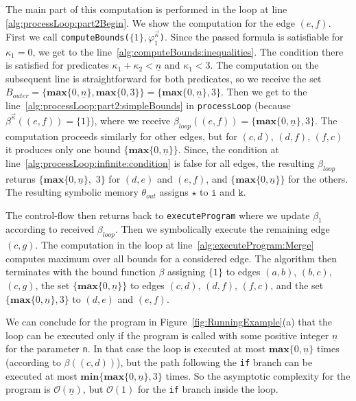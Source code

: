 \documentclass[10pt,a4paper]{article}
\newcommand{\var}[1]{\texttt{#1}}
\newcommand{\sym}[1]{\ensuremath{\underline{#1}}}
\newcommand{\maxim}{\ensuremath{\mathbf{max}}}
\newcommand{\minim}{\ensuremath{\mathbf{min}}}
\begin{document}
The main part of this computation is performed in the loop at line
\ref{alg:processLoop:part2Begin}. We show the computation for the edge
$ (e,f) $. First we call
\texttt{computeBounds(}$\{1\},
\varphi^{\vec{\kappa}}_1$\texttt{)}. Since the passed formula is
satisfiable for $ \kappa_1 = 0 $, we get to the
line~\ref{alg:computeBounds:inequalities}. The condition there is
satisfied for predicates $ \kappa_1+\kappa_2<\sym{n} $ and
$ \kappa_1 < 3 $. The computation on the subsequent line is
straightforward for both predicates, so we receive the set
$ B_\mathit{outer}=\{\maxim\{0,\sym{n}\}, \maxim\{0,3\} \}
=\{\maxim\{0,\sym{n}\}, 3\} $. Then we get to the
line~\ref{alg:processLoop:part2:simpleBounds} in \texttt{processLoop}
(because $\beta^{\vec{\kappa}}((e,f)) = \{1\}$), where we receive
$\beta_\mathit{loop}((e,f)) = \{\maxim\{0,\sym{n}\}, 3\}$. The
computation proceeds similarly for other edges, but for
$(c,d)$, $(d,f)$, $(f,c)$ it produces only one bound
$\{\maxim\{0,\sym{n}\}\}$. Since, the condition at
line~\ref{alg:processLoop:infinite:condition} is false for all edges,
the resulting $ \beta_\mathit{loop} $ returns
$ \{\maxim\{0,\sym{n}\},$ $ 3\} $ for $(d,e)$ and $(e,f)$, and
$ \{\maxim\{0,\sym{n}\}\} $ for the others. The resulting symbolic
memory $\theta_\mathit{out}$ assigns $\star$ to $\var{i}$ and
$\var{k}$.



The control-flow then returns back to \texttt{executeProgram} where we
update $\beta_1$ according to received $\beta_\mathit{loop}$. Then we
symbolically execute the remaining edge $(c,g)$. The computation in
the loop at line~\ref{alg:executeProgram:Merge} computes maximum over
all bounds for a considered edge.  The algorithm then terminates with
the bound function $\beta$ assigning $\{1\}$ to edges
$(a,b)$, $(b,c)$, $(c,g)$, the set $\{\maxim\{0,\sym{n}\}\}$ to edges
$(c,d)$, $(d,f)$, $(f,c)$, and the set $\{\maxim\{0,\sym{n}\},3\}$ to
$(d,e)$ and $(e,f)$.

We can conclude for the program in Figure~\ref{fig:RunningExample}(a)
that the loop can be executed only if the program is called with some
positive integer $ \sym{n} $ for the parameter \var{n}. In that case
the loop is executed at most $ \maxim\{0,\sym{n}\} $ times (according
to $ \beta((c,d)) $), but the path following the \texttt{if} branch
can be executed at most $\minim\{\maxim\{0,\sym{n}\},3\} $ times. So
the asymptotic complexity for the program is $ \mathcal{O}(\sym{n}) $,
but $ \mathcal{O}(1) $ for the \texttt{if} branch inside the loop.
\end{document}
